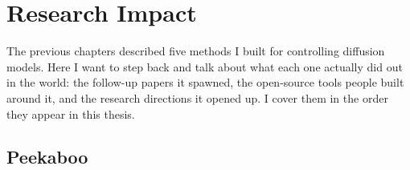 \chapter{Research Impact}
\label{chapter:impact}


The previous chapters described five methods I built for controlling diffusion models. Here I want to step back and talk about what each one actually did out in the world: the follow-up papers it spawned, the open-source tools people built around it, and the research directions it opened up. I cover them in the order they appear in this thesis.

\section{Peekaboo}

